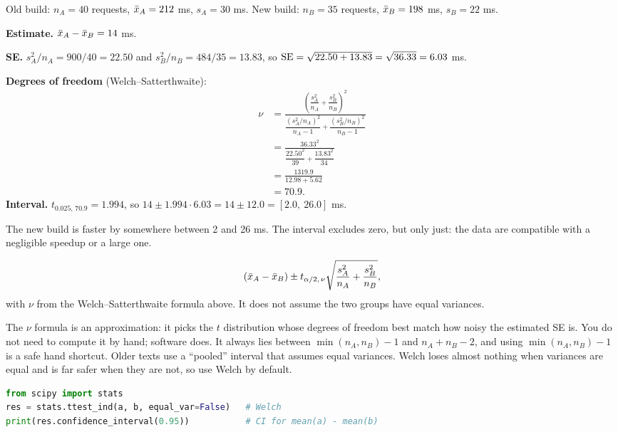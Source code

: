 \begin{walkbox}
Old build: $n_A = 40$ requests, $\bar{x}_A = 212$ ms, $s_A = 30$ ms.
New build: $n_B = 35$ requests, $\bar{x}_B = 198$ ms, $s_B = 22$ ms.

\textbf{Estimate.} $\bar{x}_A - \bar{x}_B = 14$ ms.

\textbf{SE.} $s_A^2/n_A = 900/40 = 22.50$ and $s_B^2/n_B = 484/35 = 13.83$, so
$\operatorname{SE} = \sqrt{22.50 + 13.83} = \sqrt{36.33} = 6.03$ ms.

\textbf{Degrees of freedom} (Welch--Satterthwaite):
\begin{align*}
  \nu &= \frac{\left(\dfrac{s_A^2}{n_A}+\dfrac{s_B^2}{n_B}\right)^2}
             {\dfrac{(s_A^2/n_A)^2}{n_A-1}+\dfrac{(s_B^2/n_B)^2}{n_B-1}} \\
      &= \frac{36.33^2}{\dfrac{22.50^2}{39}+\dfrac{13.83^2}{34}} \\
      &= \frac{1319.9}{12.98 + 5.62} \\
      &= 70.9 .
\end{align*}
\textbf{Interval.} $t_{0.025,\,70.9} = 1.994$, so
$14 \pm 1.994\cdot 6.03 = 14 \pm 12.0 = [2.0,\ 26.0]$ ms.

The new build is faster by somewhere between 2 and 26 ms. The interval excludes
zero, but only just: the data are compatible with a negligible speedup or a
large one.
\end{walkbox}

\begin{definition}
\[
  (\bar{x}_A - \bar{x}_B) \pm t_{\alpha/2,\,\nu}\sqrt{\frac{s_A^2}{n_A} + \frac{s_B^2}{n_B}},
\]
with $\nu$ from the Welch--Satterthwaite formula above. It does not assume
the two groups have equal variances.
\end{definition}

The $\nu$ formula is an approximation: it picks the $t$ distribution whose
degrees of freedom best match how noisy the estimated SE is. You do not need to compute it by
hand; software does. It always lies between $\min(n_A,n_B)-1$ and
$n_A+n_B-2$, and using $\min(n_A,n_B)-1$ is a safe hand shortcut. Older texts
use a ``pooled'' interval that assumes equal variances. Welch loses almost
nothing when variances are equal and is far safer when they are not, so use
Welch by default.

\begin{lstlisting}[language=Python]
from scipy import stats
res = stats.ttest_ind(a, b, equal_var=False)   # Welch
print(res.confidence_interval(0.95))           # CI for mean(a) - mean(b)
\end{lstlisting}

